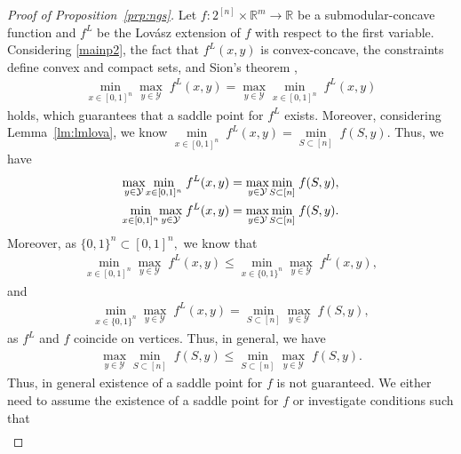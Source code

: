 \documentclass{article}
\theoremstyle{plain}
\theoremstyle{definition}
\theoremstyle{remark}
\newcommand{\R}{\mathbb{R}}
\begin{document}
\begin{proof}[Proof of Proposition~\ref{prp:ngs}]
     Let $f:2^{[n]}\times\R^m\rightarrow \mathbb{R}$ be a submodular-concave function and $f^L$ be the Lovász extension of $f$ with respect to the first variable. Considering \eqref{mainp2}, the fact that $f^L(x,y)$ is convex-concave, the constraints define convex and compact sets, %
and Sion's theorem \cite{sion1958general},
\begin{align}
    \underset{x \in [0,1]^n}{\min}\underset{y \in \mathcal{Y}}{\max}\;f^L(x,y)=\underset{y \in \mathcal{Y}}{\max}\underset{x \in [0,1]^n}{\min}\;f^L(x,y)
\end{align}
holds, which guarantees that a saddle point for $f^L$ exists. Moreover, considering Lemma~\ref{lm:lmlova}, we know $\underset{x \in [0,1]^n}{\min}\;f^L(x,y) = \underset{S \subset [n]}{\min}\;f(S,y)$. 
Thus, we have
\begin{align}\label{eq:maxmin}
    &\underset{y \in \mathcal{Y}}{\max}\underset{x \in [0,1]^n}{\min}\;f^L(x,y)=\underset{y \in \mathcal{Y}}{\max}\underset{S \subset [n]}{\min}\;f(S,y),\notag\\&
   \underset{x \in [0,1]^n}{\min} \underset{y \in \mathcal{Y}}{\max}\;f^L(x,y)=\underset{y \in \mathcal{Y}}{\max}\underset{S \subset [n]}{\min}\;f(S,y).
\end{align}
Moreover, as $\{0,1\}^n\subset[0,1]^n,$ we know that
\begin{align}\label{eq:discon}
    \underset{x \in [0,1]^n}{\min}\underset{y \in \mathcal{Y}}{\max}\;f^L(x,y)\leq\underset{x \in \{0,1\}^n}{\min}\underset{y \in \mathcal{Y}}{\max}\;f^L(x,y),
\end{align}
and %
\begin{align}\label{eq:minmax}
    \underset{x \in \{0,1\}^n}{\min}\underset{y \in \mathcal{Y}}{\max}\;f^L(x,y) = \underset{S \subset [n] }{\min}\underset{y \in \mathcal{Y}}{\max}\;f(S,y),
\end{align}
as $f^L$ and $f$ coincide on vertices. Thus, in general, we have 
\begin{align}
\underset{y \in \mathcal{Y}}{\max}\underset{S \subset [n] }{\min}\;f(S,y)\leq\underset{S \subset [n]}{\min}\underset{y \in \mathcal{Y}}{\max}\;f(S,y). \label{eq:max_min_leq}
\end{align}
Thus, in general existence of a saddle point for $f$ is not guaranteed. We either need to assume the existence of a saddle point for $f$ or investigate conditions such that 
\begin{align}\label{eq:ver}

\end{align}
\end{proof}
\end{document}
